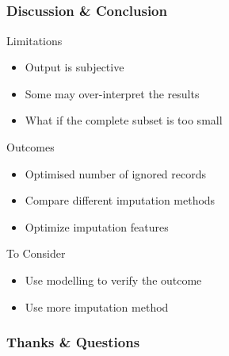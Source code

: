 \documentclass{beamer}
\newcommand{\myemph}[1]{{\bf {\color{emcolor}{#1}}}}
\begin{document}
\subsection{}

\begin{frame}
  \frametitle{Discussion \& Conclusion}
  Limitations
  \begin{itemize}
    \item Output is subjective 
    \item Some may over-interpret the results
    \item What if the complete subset is too small
  \end{itemize}
  Outcomes
  \begin{itemize}
    \item Optimised number of ignored records 
    \item Compare different imputation methods
    \item Optimize imputation features
  \end{itemize}
  To Consider
  \begin{itemize}
    \item Use modelling to verify the outcome 
    \item Use more imputation method
  \end{itemize}
\end{frame}


\begin{frame}
\frametitle{Thanks \& Questions}
\centerline{\Huge \myemph{Thanks for your attention!}}
\centerline{\Huge \myemph{Question \& Comments }}
\end{frame}
\end{document}
